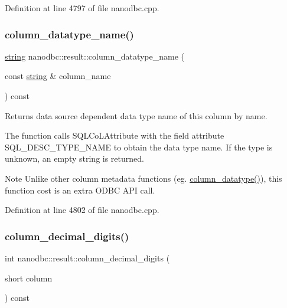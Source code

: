 Definition at line 4797 of file nanodbc.\+cpp.

\mbox{\label{classnanodbc_1_1result_a391d792c4a37be4037274b681c96da59}} 
\subsubsection{\texorpdfstring{column\_datatype\_name()}{column\_datatype\_name()}\hspace{0.1cm}{\footnotesize\ttfamily [2/2]}}
{\footnotesize\ttfamily \mbox{\hyperlink{namespacenanodbc_abfc0ece56278e590911ec8352774c212}{string}} nanodbc\+::result\+::column\+\_\+datatype\+\_\+name (\begin{DoxyParamCaption}\item[{const \mbox{\hyperlink{namespacenanodbc_abfc0ece56278e590911ec8352774c212}{string}} \&}]{column\+\_\+name }\end{DoxyParamCaption}) const}



Returns data source dependent data type name of this column by name. 

The function calls S\+Q\+L\+Co\+L\+Attribute with the field attribute S\+Q\+L\+\_\+\+D\+E\+S\+C\+\_\+\+T\+Y\+P\+E\+\_\+\+N\+A\+ME to obtain the data type name. If the type is unknown, an empty string is returned. \begin{DoxyNote}{Note}
Unlike other column metadata functions (eg. \mbox{\hyperlink{classnanodbc_1_1result_a8adc601a07a055f15908724e285133bb}{column\+\_\+datatype()}}), this function cost is an extra O\+D\+BC A\+PI call. 
\end{DoxyNote}


Definition at line 4802 of file nanodbc.\+cpp.

\mbox{\label{classnanodbc_1_1result_aa2568f3d624d65a9f850880e1d2747f8}} 
\subsubsection{\texorpdfstring{column\_decimal\_digits()}{column\_decimal\_digits()}\hspace{0.1cm}{\footnotesize\ttfamily [1/2]}}
{\footnotesize\ttfamily int nanodbc\+::result\+::column\+\_\+decimal\+\_\+digits (\begin{DoxyParamCaption}\item[{short}]{column }\end{DoxyParamCaption}) const}



